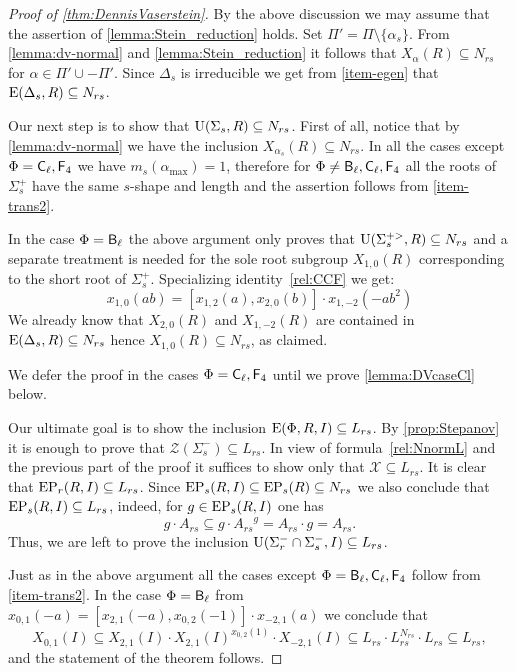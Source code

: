 \begin{proof}[Proof of \cref{thm:DennisVaserstein}]
By the above discussion we may assume that the assertion of \cref{lemma:Stein_reduction} holds.
Set $\Pi' = \Pi \setminus \{\alpha_s\}$.
From \cref{lemma:dv-normal} and \cref{lemma:Stein_reduction} it follows that $X_\alpha(R) \subseteq N_{rs}$ for $\alpha \in \Pi' \cup -\Pi'$.
Since $\Delta_s$ is irreducible we get from \cref{item-egen} that $\operatorname{E}(\Delta_s, R) \subseteq N_{rs}$.

Our next step is to show that $\operatorname{U}(\Sigma_s, R) \subseteq N_{rs}$.
First of all, notice that by \cref{lemma:dv-normal} we have the inclusion $X_{\alpha_s}(R) \subseteq N_{rs}$.
In all the cases except $\Phi=\mathsf{C}_\ell, \mathsf{F}_4$ we have $m_s(\alpha_{\mathrm{max}})=1$,
therefore for $\Phi\neq \mathsf{B}_\ell, \mathsf{C}_\ell, \mathsf{F}_4$ all the roots of $\Sigma^+_s$ have the same $s$-shape and length and the assertion follows from \cref{item-trans2}.

In the case $\Phi=\mathsf{B}_\ell$ the above argument only proves that $\operatorname{U}(\Sigma_s^{+>}, R) \subseteq N_{rs}$ and a separate treatment is needed for the sole root subgroup $X_{1,0}(R)$ corresponding to the short root of $\Sigma_s^+$.
Specializing identity~\eqref{rel:CCF} we get:
\begin{equation*} \label{rel:CCF-specBC} x_{1,0}(ab) = [x_{1, 2}(a), x_{2, 0}(b)] \cdot x_{1,-2}(-a b^2) \end{equation*}
We already know that $X_{2, 0}(R)$ and $X_{1,-2}(R)$ are contained in $\operatorname{E}(\Delta_s, R) \subseteq N_{rs}$ hence $X_{1,0}(R) \subseteq N_{rs}$, as claimed.

We defer the proof in the cases $\Phi=\mathsf{C}_\ell, \mathsf{F}_4$ until we prove \cref{lemma:DVcaseCl} below.

Our ultimate goal is to show the inclusion $\operatorname{E}(\Phi, R, I) \subseteq L_{rs}$. 
By \cref{prop:Stepanov} it is enough to prove that $\mathcal{Z}(\Sigma^-_s) \subseteq L_{rs}$.
In view of formula~\eqref{rel:NnormL} and the previous part of the proof it suffices to show only that $\mathcal{X} \subseteq L_{rs}$.
It is clear that $\operatorname{EP}_r(R, I) \subseteq L_{rs}$.
Since $\operatorname{EP}_s(R, I) \subseteq \operatorname{EP}_s(R) \subseteq N_{rs}$ we also conclude that $\operatorname{EP}_s(R, I) \subseteq L_{rs}$, indeed, for $g \in \operatorname{EP}_s(R,I)$ one has
\[ g \cdot A_{rs} \subseteq g \cdot {A_{rs}}^g = A_{rs} \cdot g = A_{rs}. \]
Thus, we are left to prove the inclusion $\operatorname{U}(\Sigma^-_r \cap \Sigma^-_s, I) \subseteq L_{rs}$.

Just as in the above argument all the cases except $\Phi = \mathsf{B}_\ell, \mathsf{C}_\ell, \mathsf{F}_4$ follow from \cref{item-trans2}.
In the case $\Phi=\mathsf{B}_\ell$ from $x_{0, 1}(-a) = [x_{2,1}(-a), x_{0, 2}(-1)]\cdot x_{-2,1}(a)$ we conclude that
$$X_{0,1}(I) \subseteq X_{2,1}(I) \cdot X_{2,1}(I)^{x_{0,2}(1)} \cdot X_{-2,1}(I) \subseteq L_{rs} \cdot L_{rs}^{N_{rs}} \cdot L_{rs} \subseteq L_{rs},$$
and the statement of the theorem follows. \end{proof}

